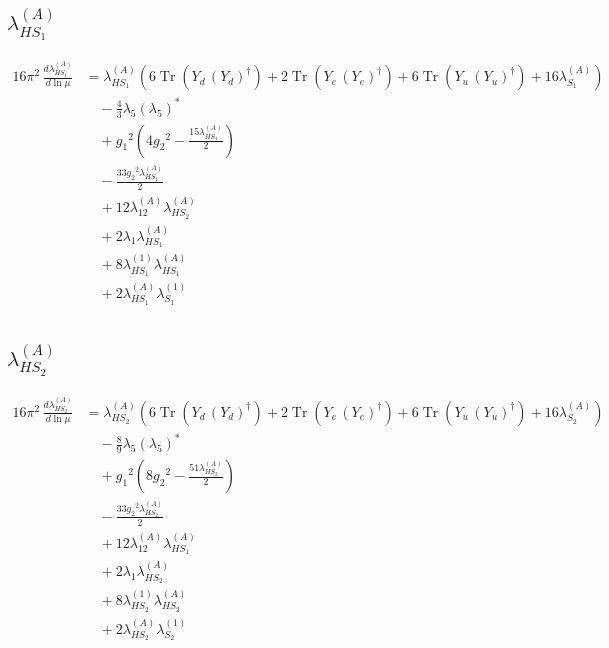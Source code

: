 \documentclass[10pt,a4paper]{article}
\begin{document}
\subsection*{$\lambda_{HS_1}^{(A)}$}
\begin{align*}
16\pi^2\,\frac{d \lambda_{HS_1}^{(A)}}{d\ln\mu} &={\lambda_{HS_1}^{(A)}} (6 \operatorname{Tr}\!\left({Y_d}\,\left({Y_d}\right)^{\dagger}\right)+2 \operatorname{Tr}\!\left({Y_e}\,\left({Y_e}\right)^{\dagger}\right)+6 \operatorname{Tr}\!\left({Y_u}\,\left({Y_u}\right)^{\dagger}\right)+16 {\lambda_{S_1}^{(A)}}) \\
&\quad -\frac{4}{3} {\lambda_5} \left({\lambda_5}\right)^{*} \\
&\quad +{g_1}^2 \left(4 {g_2}^2-\frac{15 {\lambda_{HS_1}^{(A)}}}{2}\right) \\
&\quad -\frac{33 {g_2}^2 {\lambda_{HS_1}^{(A)}}}{2} \\
&\quad +12 {\lambda_{12}^{(A)}} {\lambda_{HS_2}^{(A)}} \\
&\quad +2 {\lambda_1} {\lambda_{HS_1}^{(A)}} \\
&\quad +8 {\lambda_{HS_1}^{(1)}} {\lambda_{HS_1}^{(A)}} \\
&\quad +2 {\lambda_{HS_1}^{(A)}} {\lambda_{S_1}^{(1)}} \\
\end{align*}
\subsection*{$\lambda_{HS_2}^{(A)}$}
\begin{align*}
16\pi^2\,\frac{d \lambda_{HS_2}^{(A)}}{d\ln\mu} &={\lambda_{HS_2}^{(A)}} (6 \operatorname{Tr}\!\left({Y_d}\,\left({Y_d}\right)^{\dagger}\right)+2 \operatorname{Tr}\!\left({Y_e}\,\left({Y_e}\right)^{\dagger}\right)+6 \operatorname{Tr}\!\left({Y_u}\,\left({Y_u}\right)^{\dagger}\right)+16 {\lambda_{S_2}^{(A)}}) \\
&\quad -\frac{8}{9} {\lambda_5} \left({\lambda_5}\right)^{*} \\
&\quad +{g_1}^2 \left(8 {g_2}^2-\frac{51 {\lambda_{HS_2}^{(A)}}}{2}\right) \\
&\quad -\frac{33 {g_2}^2 {\lambda_{HS_2}^{(A)}}}{2} \\
&\quad +12 {\lambda_{12}^{(A)}} {\lambda_{HS_1}^{(A)}} \\
&\quad +2 {\lambda_1} {\lambda_{HS_2}^{(A)}} \\
&\quad +8 {\lambda_{HS_2}^{(1)}} {\lambda_{HS_2}^{(A)}} \\
&\quad +2 {\lambda_{HS_2}^{(A)}} {\lambda_{S_2}^{(1)}} \\
\end{align*}
\end{document}
